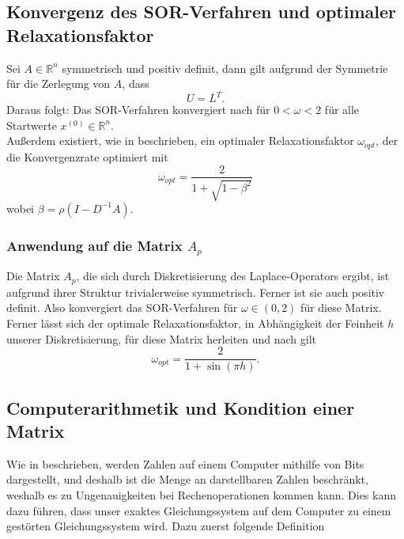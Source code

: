 \documentclass{scrartcl}
\begin{document}
\subsection{Konvergenz des SOR-Verfahren und optimaler Relaxationsfaktor}
\begin{theorem}
    Sei \(A \in \mathbb{R}^n\) symmetrisch und positiv definit, dann gilt aufgrund der Symmetrie
    für die Zerlegung von \(A\), dass
    \[U = L^T.\]
    Daraus folgt: Das SOR-Verfahren konvergiert nach \cite[p.~183-185]{SOR} für \(0 < \omega < 2\) für alle
    Startwerte \(x^{(0)} \in \mathbb{R}^n\). \\
    Außerdem existiert, wie in \cite[p.~4]{omega_opt} beschrieben, ein optimaler Relaxationsfaktor \(\omega_{opt}\), der die Konvergenzrate optimiert mit
    \[\omega_{opt}=\frac{2}{1+\sqrt{1-\beta^2}}\]
    wobei \(\beta=\rho(I-D^{-1}A)\).
\end{theorem}


\subsubsection{Anwendung auf die Matrix \(A_{p}\)}
Die Matrix \(A_p\), die sich durch Diskretisierung des Laplace-Operators ergibt, ist aufgrund ihrer Struktur trivialerweise symmetrisch. Ferner ist sie auch positiv definit\cite[p.~11]{PosDef}.
Also konvergiert das SOR-Verfahren für \(\omega \in (0, 2)\) für diese Matrix.
\\
Ferner lässt sich der optimale Relaxationsfaktor, in Abhängigkeit der Feinheit \(h\) unserer Diskretisierung, für diese Matrix herleiten und nach \cite{omega_opt} gilt
\[\omega_{opt}=\frac{2}{1+\sin(\pi h)}.\] 


\subsection{Computerarithmetik und Kondition einer Matrix}
Wie in \cite[p.~3]{HandoutFiniteDifferenzen} beschrieben, werden Zahlen auf einem Computer mithilfe von Bits dargestellt, und deshalb ist die Menge
an darstellbaren Zahlen beschränkt, weshalb es zu Ungenauigkeiten bei Rechenoperationen kommen kann.
Dies kann dazu führen, dass unser exaktes Gleichungssystem auf dem Computer zu einem gestörten
Gleichungssystem wird.
Dazu zuerst folgende Definition
\end{document}
